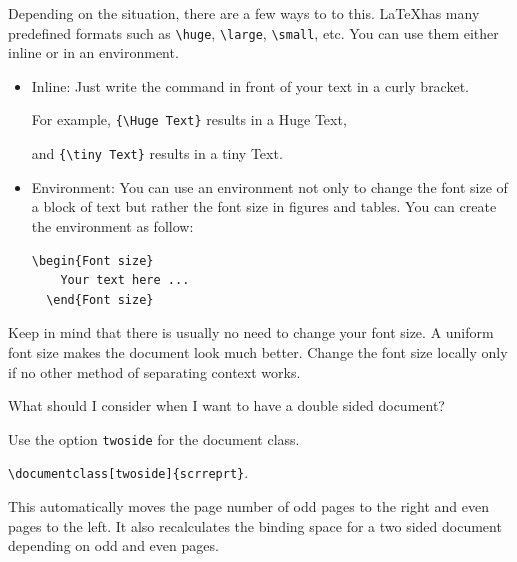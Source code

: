 \begin{QandA}
		\begin{answered}
		Depending on the situation, there are a few ways to to this. \LaTeX has many predefined formats such as \verb|\huge|, \verb|\large|, \verb|\small|, etc. You can use them either inline or in an environment.
		
		\begin{itemize}
			\item Inline: Just write the command in front of your text in a curly bracket.
			
			For example, \verb|{\Huge Text}| results in a {\Huge Huge Text}, 
			
			and \verb|{\tiny Text}| results in a {\tiny tiny Text}.
			
			\item Environment: You can use an environment not only to change the font size of a block of text but rather the font size in figures and tables. You can create the environment as follow:
			
			\begin{lstlisting}[language={[LaTeX]{TeX}},basicstyle=\ttfamily]
  \begin{Font size}
  	Your text here ...	 	
  \end{Font size}
			\end{lstlisting}
							
		\end{itemize}
		
		Keep in mind that there is usually no need to change your font size. A uniform font size makes the document look much better. Change the font size locally only if no other method of separating context works.
		\end{answered}
		
		
		
\item What should I consider when I want to have a double sided document?
	
		\begin{answered}
		Use the option \texttt{twoside} for the document class.
		
		\verb|\documentclass[twoside]{scrreprt}|.
		
		This automatically moves the page number of odd pages to the right and even pages to the left. It also recalculates the binding space for a two sided document depending on odd and even pages.
		
		\end{answered}
		
		
		

\end{QandA}
